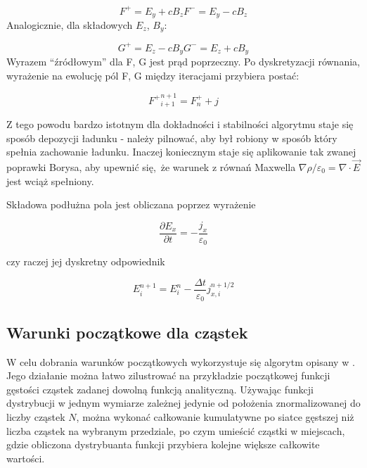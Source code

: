 
    \begin{equation}
        F^{+} = E_y + c B_z
        F^{-} = E_y - c B_z
        \label{eqn:Birdsall-electromagnetic-quantities}
    \end{equation}
    Analogicznie, dla składowych $E_z$, $B_y$:

    \begin{equation}
        G^{+} = E_z - c B_y
        G^{-} = E_z + c B_y
        \label{eqn:Birdsall-electromagnetic-quantities-alternate-axes}
    \end{equation}
    Wyrazem ``źródłowym'' dla F, G jest prąd poprzeczny. Po dyskretyzacji równania, wyrażenie na ewolucję pól F, G między
    iteracjami przybiera postać:

    \begin{equation}
        {F^{+}}^{n+1}_{i+1} = F^{+}_{n} + j%
    \end{equation}

    Z tego powodu bardzo istotnym dla dokładności i stabilności algorytmu staje się sposób depozycji ładunku - należy pilnować,
    aby był robiony w sposób który spełnia zachowanie ładunku. Inaczej koniecznym staje się aplikowanie tak zwanej
    poprawki Borysa, %
    aby upewnić się, że warunek z równań Maxwella $\nabla \rho / \varepsilon_0 = \nabla \cdot \vec{E}$ jest
    wciąż spełniony.

    Składowa podłużna pola jest obliczana poprzez wyrażenie

    \begin{equation}
    \frac{\partial E_x}{\partial t} = - \frac{j_x}{\varepsilon_0}
    \label{longitudinal-field-differential}
    \end{equation}

    czy raczej jej dyskretny odpowiednik

    \begin{equation}
        E_i^{n+1} = E_i^n - \frac{\Delta t}{\varepsilon_0} j_{x,i}^{n+1/2}
    \label{longitudinal-field-finite-differential}
    \end{equation}


    \subsection{Warunki początkowe dla cząstek}

    W celu dobrania warunków początkowych wykorzystuje się algorytm opisany w .%
    Jego działanie można łatwo zilustrować na przykładzie początkowej funkcji gęstości cząstek zadanej
    dowolną funkcją analityczną. %
    Używając funkcji dystrybucji w jednym wymiarze zależnej jedynie od położenia znormalizowanej do
    liczby cząstek $N$, można wykonać całkowanie kumulatywne po siatce gęstszej niż liczba cząstek
    na wybranym przedziale, po czym umieścić cząstki w miejscach, gdzie obliczona dystrybuanta funkcji
    przybiera kolejne większe całkowite wartości.

